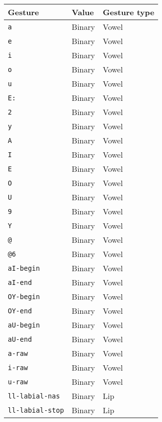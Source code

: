 \begin{table}[ht!]
  \renewcommand{\arraystretch}{0.9}
  \begin{scriptsize}
    \begin{center}
      \begin{tabular}{lll}
        \toprule
        Gesture & Value & Gesture type \\
        \midrule
        \texttt{a} & Binary & Vowel \\
        \texttt{e} & Binary & Vowel \\
        \texttt{i} & Binary & Vowel \\
        \texttt{o} & Binary & Vowel \\
        \texttt{u} & Binary & Vowel \\
        \texttt{E:} & Binary & Vowel \\
        \texttt{2} & Binary & Vowel \\
        \texttt{y} & Binary & Vowel \\
        \texttt{A} & Binary & Vowel \\
        \texttt{I} & Binary & Vowel \\
        \texttt{E} & Binary & Vowel \\
        \texttt{O} & Binary & Vowel \\
        \texttt{U} & Binary & Vowel \\
        \texttt{9} & Binary & Vowel \\
        \texttt{Y} & Binary & Vowel \\
        \texttt{@} & Binary & Vowel \\
        \texttt{@6} & Binary & Vowel \\
        \texttt{aI-begin} & Binary & Vowel \\
        \texttt{aI-end} & Binary & Vowel \\
        \texttt{OY-begin} & Binary & Vowel \\
        \texttt{OY-end} & Binary & Vowel \\
        \texttt{aU-begin} & Binary & Vowel \\
        \texttt{aU-end} & Binary & Vowel \\
        \texttt{a-raw} & Binary & Vowel \\
        \texttt{i-raw} & Binary & Vowel \\
        \texttt{u-raw} & Binary & Vowel \\
        \texttt{ll-labial-nas} & Binary & Lip \\
        \texttt{ll-labial-stop} & Binary & Lip \\

\end{tabular}
\end{center}
\end{scriptsize}
\end{table}
